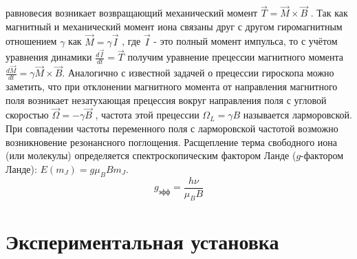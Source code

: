 \documentclass[a4paper,12pt]{article} %
\begin{document}
    равновесия возникает возвращающий механический момент $\vec{T}=\vec{M}\times \vec{B}$ . Так как
    магнитный и механический момент иона связаны друг с другом гиромагнитным отношением
    $\gamma$ как $\vec{M} =\gamma \vec{I}$ , где $\vec{I}$ - это полный момент импульса, то с учётом уравнения динамики $\frac{d\vec{I}}{dt} = \vec{T}$ получим уравнение прецессии магнитного момента $\frac{d\vec{M}}{dt} = \gamma \vec{M}\times \vec{B}$. Аналогично
    с известной задачей о прецессии гироскопа можно заметить, что при отклонении магнитного
    момента от направления магнитного поля возникает незатухающая прецессия вокруг
    направления поля с угловой скоростью $\vec{\Omega}= - \gamma \vec{B}$ , частота этой прецессии $\Omega_L=\gamma B$
    называется ларморовской. При совпадении частоты переменного поля с ларморовской
    частотой возможно возникновение резонансного поглощения.
    Расщепление терма свободного иона (или молекулы) определяется спектроскопическим
    фактором Ланде ($g$-фактором Ланде): $E(m_J)=g\mu_B B m_J$.
    \begin{equation}
      g_{\text{эфф}} = \frac{h \nu}{\mu_B B}
    \end{equation}
  
    \section{Экспериментальная установка}
    
\end{document}
